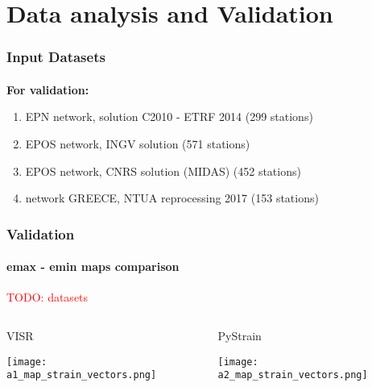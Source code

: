 \section{Data analysis and Validation}

\graphicspath{{Chapter3/Figs/}}

\begin{frame}
  \frametitle{Input Datasets}
  \framesubtitle{}
  \label{ch3:data}
  
  \textbf{For validation:}
  \begin{enumerate}
    \item EPN network, solution C2010 - ETRF 2014 (299 stations)
    \item EPOS network, INGV solution (571 stations)
    \item EPOS network, CNRS solution (MIDAS) (452 stations)
    \item network GREECE, NTUA reprocessing 2017 (153 stations)
  \end{enumerate}
    
\end{frame}
\note{}

\begin{frame}
  \frametitle{Validation}
  \framesubtitle{emax - emin maps comparison}
  \label{ch3:data}
  \textcolor{red}{TODO: datasets}
  \begin{columns}
    \begin{column}{0.5\textwidth}
      VISR
      
      \texttt{[image: a1\_map\_strain\_vectors.png]}   
    \end{column}
    \begin{column}{0.5\textwidth}
    \begin{center}
      PyStrain
      
      \texttt{[image: a2\_map\_strain\_vectors.png]}     
    \end{center}
    \end{column}
  \end{columns}

\end{frame}
\note{}

%       
%       
% 


